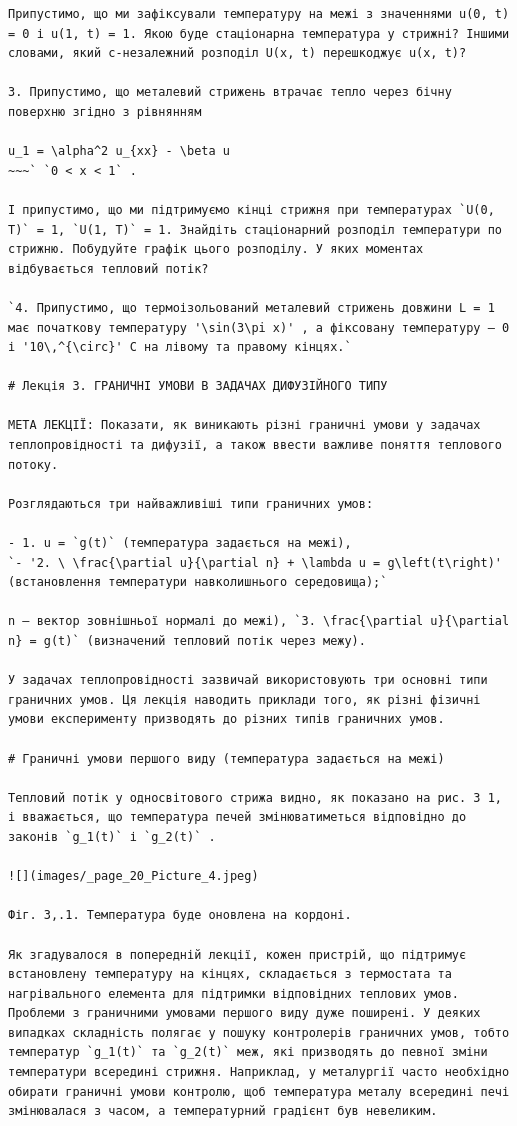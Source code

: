 \documentclass[
  ukrainian,
]{article}
\begin{document}
\begin{verbatim}
Припустимо, що ми зафіксували температуру на межі з значеннями u(0, t) = 0 і u(1, t) = 1. Якою буде стаціонарна температура у стрижні? Іншими словами, який c-незалежний розподіл U(x, t) перешкоджує u(x, t)?

3. Припустимо, що металевий стрижень втрачає тепло через бічну поверхню згідно з рівнянням

u_1 = \alpha^2 u_{xx} - \beta u
~~~` `0 < x < 1` .

І припустимо, що ми підтримуємо кінці стрижня при температурах `U(0, T)` = 1, `U(1, T)` = 1. Знайдіть стаціонарний розподіл температури по стрижню. Побудуйте графік цього розподілу. У яких моментах відбувається тепловий потік?

`4. Припустимо, що термоізольований металевий стрижень довжини L = 1 має початкову температуру '\sin(3\pi x)' , а фіксовану температуру — 0 і '10\,^{\circ}' C на лівому та правому кінцях.`

# Лекція 3. ГРАНИЧНІ УМОВИ В ЗАДАЧАХ ДИФУЗІЙНОГО ТИПУ

МЕТА ЛЕКЦІЇ: Показати, як виникають різні граничні умови у задачах теплопровідності та дифузії, а також ввести важливе поняття теплового потоку.

Розглядаються три найважливіші типи граничних умов:

- 1. u = `g(t)` (температура задається на межі),
`- '2. \ \frac{\partial u}{\partial n} + \lambda u = g\left(t\right)' (встановлення температури навколишнього середовища);`

n — вектор зовнішньої нормалі до межі), `3. \frac{\partial u}{\partial n} = g(t)` (визначений тепловий потік через межу).

У задачах теплопровідності зазвичай використовують три основні типи граничних умов. Ця лекція наводить приклади того, як різні фізичні умови експерименту призводять до різних типів граничних умов.

# Граничні умови першого виду (температура задається на межі)

Тепловий потік у односвітового стрижа видно, як показано на рис. 3 1, і вважається, що температура печей змінюватиметься відповідно до законів `g_1(t)` і `g_2(t)` .

![](images/_page_20_Picture_4.jpeg)

Фіг. 3,.1. Температура буде оновлена на кордоні.

Як згадувалося в попередній лекції, кожен пристрій, що підтримує встановлену температуру на кінцях, складається з термостата та нагрівального елемента для підтримки відповідних теплових умов. Проблеми з граничними умовами першого виду дуже поширені. У деяких випадках складність полягає у пошуку контролерів граничних умов, тобто температур `g_1(t)` та `g_2(t)` меж, які призводять до певної зміни температури всередині стрижня. Наприклад, у металургії часто необхідно обирати граничні умови контролю, щоб температура металу всередині печі змінювалася з часом, а температурний градієнт був невеликим.


\end{verbatim}
\end{document}

